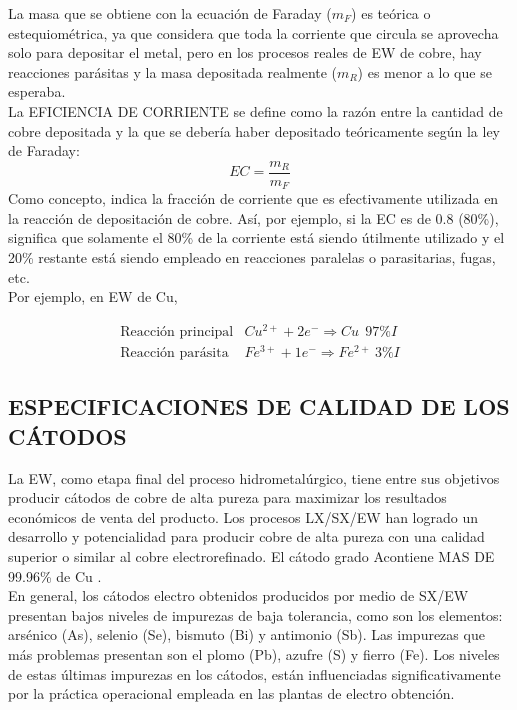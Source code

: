 La masa que se obtiene con la ecuaci\'on de Faraday ($m_F$) es te\'orica o estequiom\'etrica, ya que considera que toda la corriente que circula se aprovecha solo para depositar el metal, pero en los procesos reales de EW de cobre, hay reacciones par\'asitas y la masa depositada realmente ($m_R$) es menor a lo que se esperaba.\\
La EFICIENCIA DE CORRIENTE se define como la raz\'on entre la cantidad de cobre depositada y la que se deber\'ia haber depositado te\'oricamente seg\'un la ley de Faraday:\\
\begin{equation}
 EC=\frac{m_R}{m_F}
\end{equation}
Como concepto, indica la fracci\'on de corriente que es efectivamente utilizada en la reacci\'on de depositaci\'on de cobre. As\'i, por ejemplo, si la EC es de 0.8 (80\%), significa que solamente el 80\% de la corriente est\'a siendo \'utilmente utilizado y el 20\% restante est\'a siendo empleado en reacciones paralelas o parasitarias, fugas, etc.\\
Por ejemplo, en EW de Cu, 

\begin{equation}
 \begin{align}
  \text{Reacci\'on principal}&Cu^{2+} + 2e^- \Rightarrow Cu \:\:97\% I \\
  \text{Reacci\'on par\'asita}&Fe^{3+} + 1e^- \Rightarrow Fe^{2+}\: 3\% I
 \end{align}
\end{equation}

\subsection{ESPECIFICACIONES DE CALIDAD DE LOS C\'ATODOS}
La EW, como etapa final del proceso hidrometal\'urgico, tiene entre sus objetivos producir c\'atodos de cobre de alta pureza para maximizar los resultados econ\'omicos de venta del producto. Los procesos LX/SX/EW han logrado un desarrollo y potencialidad para producir cobre de alta pureza con una calidad superior o similar al cobre electrorefinado. El c\'atodo \textacutedbl grado A\textgravedbl contiene MAS DE 99.96\% de Cu .\\

En general, los c\'atodos electro obtenidos producidos por medio de SX/EW presentan bajos niveles de impurezas de baja tolerancia, como son los elementos: ars\'enico (As), selenio (Se), bismuto (Bi) y antimonio (Sb). Las impurezas que m\'as problemas presentan son el plomo (Pb), azufre (S) y fierro (Fe). Los niveles de estas \'ultimas impurezas en los c\'atodos, est\'an influenciadas significativamente por la pr\'actica operacional empleada en las plantas de electro obtenci\'on.\\

